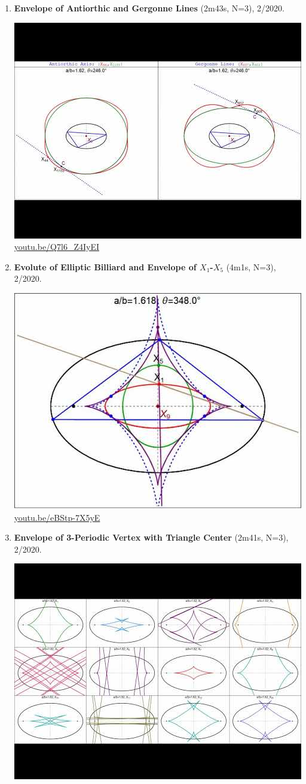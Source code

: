 \documentclass[12pt]{amsart}
\begin{document}
\begin{enumerate}[resume]
\item \textbf{Envelope of Antiorthic and Gergonne Lines} (2m43s, N=3), 2/2020. 
\begin{center}\includegraphics[width=.5\textwidth]{pics/Q7l6_Z4IyEI.jpg} \\ 
\href{https://youtu.be/Q7l6_Z4IyEI}{\url{youtu.be/Q7l6\_Z4IyEI}}\end{center}
% 
\item \textbf{Evolute of Elliptic Billiard and Envelope of $X_{1}$-$X_{5}$} (4m1s, N=3), 2/2020. 
\begin{center}\includegraphics[width=.5\textwidth]{pics/eBStp-7X5yE.jpg} \\ 
\href{https://youtu.be/eBStp-7X5yE}{\url{youtu.be/eBStp-7X5yE}}\end{center}
% 
\item \textbf{Envelope of 3-Periodic Vertex with Triangle Center} (2m41s, N=3), 2/2020. 
\begin{center}\includegraphics[width=.5\textwidth]{pics/bRY61RdxCkM.jpg} \\ 

\end{center}
\end{enumerate}
\end{document}
